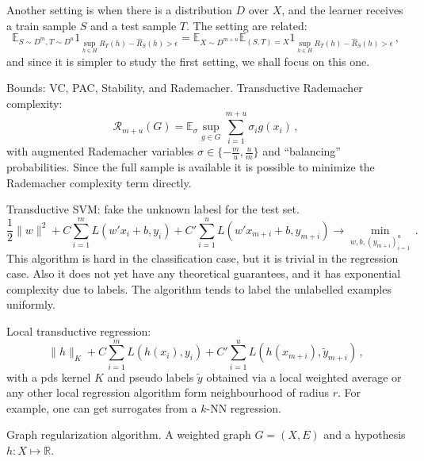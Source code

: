 \documentclass[a4paper]{article}
\newcommand{\Real}{\mathbb{R}}
\newcommand{\ex}{\mathbb{E}}
\begin{document}
Another setting is when there is a distribution $D$ over $X$, and the learner receives
a train sample $S$ and a test sample $T$. The setting are related:
\[ \ex_{S\sim D^m, T\sim D^u}
        1_{\sup_{h\in H} R_T(h) - \hat{R}_S(h) > \epsilon} 
    = \ex_{X\sim D^{m+u}} \ex_{(S, T) = X}
        1_{\sup_{h\in H} R_T(h) - \hat{R}_S(h) > \epsilon}
    \,, \]
and since it is simpler to study the first setting, we shall focus on this one.

Bounds: VC, PAC, Stability, and Rademacher. Transductive Rademacher complexity:
\[\mathcal{R}_{m+u}(G) = \ex_\sigma \sup_{g\in G} \sum_{i=1}^{m+u} \sigma_i g(x_i) \,, \]
with augmented Rademacher variables $\sigma \in \{-\frac{m}{u}, \frac{u}{m}\}$ and
``balancing'' probabilities.
Since the full sample is available it is possible to minimize the Rademacher complexity
term directly.


Transductive SVM: fake the unknown labesl for the test set.
\[ \frac{1}{2} \|w\|^2
    + C\sum_{i=1}^m L(w'x_i + b, y_i)
    + C'\sum_{i=1}^u L(w'x_{m+i} + b, y_{m+i})
    \to \min_{w, b,(y_{m+i})_{i=1}^u }
    \,.\]
This algorithm is hard in the classification case, but it is trivial in the regression
case. Also it does not yet have any theoretical guarantees, and it has exponential
complexity due to labels. The algorithm tends to label the unlabelled examples uniformly.

Local transductive regression:
\[ \|h\|_K + C \sum_{i=1}^m L(h(x_i), y_i)
     + C' \sum_{i=1}^u L(h(x_{m+i}), \tilde{y}_{m+i})
     \,, \]
with a pds kernel $K$ and pseudo labels $\tilde{y}$ obtained via a local weighted
average or any other local regression algorithm form neighbourhood of radius $r$.
For example, one can get surrogates from a $k$-NN regression.

Graph regularization algorithm. A weighted graph $G=(X, E)$ and a hypothesis $h:X\mapsto \Real$.




\end{document}

